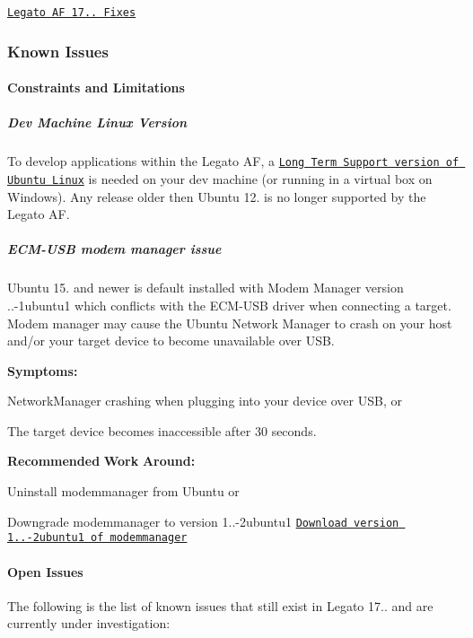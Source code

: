 \href{https://github.com/legatoproject/legato-af/commits/17.06.0}{\tt Legato AF 17.. Fixes}\hypertarget{releaseNotes17060_rn17_06_KnownIssues}{}\subsubsection{Known Issues}\label{releaseNotes17060_rn17_06_KnownIssues}
\hypertarget{releaseNotes17060_rn17_06_Constraints}{}\paragraph{Constraints and Limitations}\label{releaseNotes17060_rn17_06_Constraints}
\hypertarget{releaseNotes17060_rn17_06_ContraintsLinuxSupport}{}\subparagraph{Dev Machine Linux Version}\label{releaseNotes17060_rn17_06_ContraintsLinuxSupport}
To develop applications within the Legato AF, a \href{https://www.ubuntu.com/info/release-end-of-life}{\tt Long Term Support version of Ubuntu Linux} is needed on your dev machine (or running in a virtual box on Windows). Any release older then Ubuntu 12. is no longer supported by the Legato AF.\hypertarget{releaseNotes17060_rn17_06_ConstECMUSB}{}\subparagraph{E\+C\+M-\/\+U\+S\+B modem manager issue}\label{releaseNotes17060_rn17_06_ConstECMUSB}
Ubuntu 15. and newer is default installed with Modem Manager version {..-\/1ubuntu1} which conflicts with the E\+C\+M-\/\+U\+SB driver when connecting a target. Modem manager may cause the Ubuntu Network Manager to crash on your host and/or your target device to become unavailable over U\+SB.

{\bfseries Symptoms\+:} 
\begin{DoxyItemize}
\item Network\+Manager crashing when plugging into your device over U\+SB, or
\item The target device becomes inaccessible after 30 seconds.
\end{DoxyItemize}

{\bfseries Recommended} {\bfseries Work} {\bfseries Around\+:} 
\begin{DoxyItemize}
\item Uninstall {\ttfamily modemmanager} from Ubuntu or
\item Downgrade {\ttfamily modemmanager} to version 1..-\/2ubuntu1 \href{http://packages.ubuntu.com/trusty/modemmanager}{\tt Download version 1..-\/2ubuntu1 of modemmanager}
\end{DoxyItemize}\hypertarget{releaseNotes17060_rn17_06_OpenIssues}{}\paragraph{Open Issues}\label{releaseNotes17060_rn17_06_OpenIssues}
The following is the list of known issues that still exist in Legato 17.. and are currently under investigation\+:

